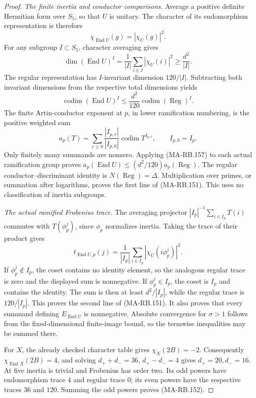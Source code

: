\begin{proof}
\emph{The finite inertia and conductor comparisons.}
Average a positive definite Hermitian form over \(S_5\),
so that \(U\) is unitary.  The character of its endomorphism
representation is therefore
\[
             \chi_{\operatorname{End}U}(g)=|\chi_U(g)|^2.
 \tag{MA-RB.156}
\]
For any subgroup \(I\subset S_5\), character averaging gives
\[
 \dim(\operatorname{End}U)^I
   =\frac1{|I|}\sum_{i\in I}|\chi_U(i)|^2
   \ge\frac{d^2}{|I|}.
\]
The regular representation has \(I\)-invariant dimension
\(120/|I|\).  Subtracting both invariant dimensions from
the respective total dimensions yields
\[
 \operatorname{codim}(\operatorname{End}U)^I
      \le\frac{d^2}{120}\operatorname{codim}
                                      (\operatorname{Reg})^I.
 \tag{MA-RB.157}
\]
The finite Artin-conductor exponent at \(p\), in lower
ramification numbering, is the positive weighted sum
\[
 a_p(T)=\sum_{r\ge0}
          \frac{|I_{p,r}|}{|I_{p,0}|}
                        \operatorname{codim}T^{I_{p,r}},
       \qquad I_{p,0}=I_p.
 \tag{MA-RB.158}
\]
Only finitely many summands are nonzero.  Applying
(MA-RB.157) to each actual ramification group proves
\(a_p(\operatorname{End}U)\le(d^2/120)a_p(\operatorname{Reg})\).
The regular conductor--discriminant identity is
\(N(\operatorname{Reg})=\Delta\).  Multiplication over
primes, or summation after logarithms, proves the first
line of (MA-RB.151).  This uses no classification of
inertia subgroups.

\emph{The actual ramified Frobenius trace.}
The averaging projector
\(|I_p|^{-1}\sum_{i\in I_p}T(i)\) commutes with
\(T(\phi_p^j)\), since \(\phi_p\) normalizes inertia.
Taking the trace of their product gives
\[
 t_{\operatorname{End}U,p}(j)
   =\frac1{|I_p|}\sum_{i\in I_p}
                        |\chi_U(i\phi_p^j)|^2 .
 \tag{MA-RB.159}
\]
If \(\phi_p^j\notin I_p\), the coset contains no
identity element, so the analogous regular trace is
zero and the displayed sum is nonnegative.
If \(\phi_p^j\in I_p\), the coset is \(I_p\) and
contains the identity.  The sum is then at least
\(d^2/|I_p|\), while the regular trace is \(120/|I_p|\).
This proves the second line of (MA-RB.151).
It also proves that every summand defining
\(E_{\operatorname{End}U}\) is nonnegative.
Absolute convergence for \(\sigma>1\) follows from
the fixed-dimensional finite-image bound, so the
termwise inequalities may be summed there.

For \(X\), the already checked character table gives
\(\chi_X(2B)=-2\).  Consequently
\(\chi_{\operatorname{End}X}(2B)=4\), and solving
\(d_++d_-=36\), \(d_+-d_-=4\) gives \(d_+=20,d_-=16\).
At five inertia is trivial and Frobenius has order two.
Its odd powers have endomorphism trace \(4\) and regular
trace \(0\); its even powers have the respective traces
\(36\) and \(120\).  Summing the odd powers proves
(MA-RB.152).


\end{proof}
